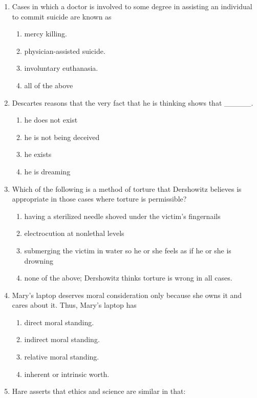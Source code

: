 \documentclass[12pt]{article}
\begin{document}
\begin{enumerate}[label=\arabic*.]
\begin{enumerate}[label=(\alph*)]
    \item the insult involved.
\end{enumerate}
\item Cases in which a doctor is involved to some degree in assisting an individual to commit suicide are known as
\begin{enumerate}[label=(\alph*)]
    \item mercy killing.
    \item physician-assisted suicide.
    \item involuntary euthanasia.
    \item all of the above
\end{enumerate}
\item Descartes reasons that the very fact that he is thinking shows that \_\_\_\_\_.
\begin{enumerate}[label=(\alph*)]
    \item he does not exist
    \item he is not being deceived
    \item he exists
    \item he is dreaming
\end{enumerate}
\item Which of the following is a method of torture that Dershowitz believes is appropriate in those cases where torture is permissible?
\begin{enumerate}[label=(\alph*)]
    \item having a sterilized needle shoved under the victim's fingernails
    \item electrocution at nonlethal levels
    \item submerging the victim in water so he or she feels as if he or she is drowning
    \item none of the above; Dershowitz thinks torture is wrong in all cases.
\end{enumerate}
\item Mary's laptop deserves moral consideration only because she owns it and cares about it. Thus, Mary's laptop has
\begin{enumerate}[label=(\alph*)]
    \item direct moral standing.
    \item indirect moral standing.
    \item relative moral standing.
    \item inherent or intrinsic worth.
\end{enumerate}
\item Hare asserts that ethics and science are similar in that:

\end{enumerate}
\end{document}
